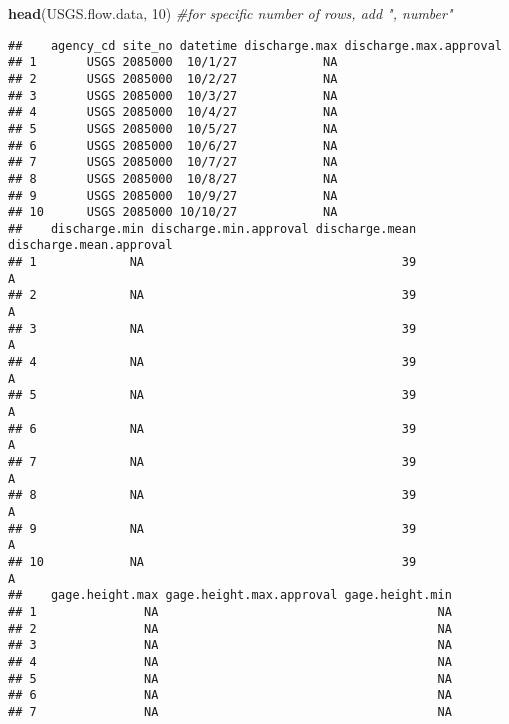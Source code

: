 \documentclass[]{article}
\newenvironment{Shaded}{\begin{snugshade}}{\end{snugshade}}
\newcommand{\CommentTok}[1]{\textcolor[rgb]{0.56,0.35,0.01}{\textit{#1}}}
\newcommand{\DecValTok}[1]{\textcolor[rgb]{0.00,0.00,0.81}{#1}}
\newcommand{\KeywordTok}[1]{\textcolor[rgb]{0.13,0.29,0.53}{\textbf{#1}}}
\newcommand{\NormalTok}[1]{#1}
\begin{document}
\begin{Shaded}
\begin{Highlighting}[]
\KeywordTok{head}\NormalTok{(USGS.flow.data, }\DecValTok{10}\NormalTok{) }\CommentTok{#for specific number of rows, add ", number"}
\end{Highlighting}
\end{Shaded}

\begin{verbatim}
##    agency_cd site_no datetime discharge.max discharge.max.approval
## 1       USGS 2085000  10/1/27            NA                       
## 2       USGS 2085000  10/2/27            NA                       
## 3       USGS 2085000  10/3/27            NA                       
## 4       USGS 2085000  10/4/27            NA                       
## 5       USGS 2085000  10/5/27            NA                       
## 6       USGS 2085000  10/6/27            NA                       
## 7       USGS 2085000  10/7/27            NA                       
## 8       USGS 2085000  10/8/27            NA                       
## 9       USGS 2085000  10/9/27            NA                       
## 10      USGS 2085000 10/10/27            NA                       
##    discharge.min discharge.min.approval discharge.mean discharge.mean.approval
## 1             NA                                    39                       A
## 2             NA                                    39                       A
## 3             NA                                    39                       A
## 4             NA                                    39                       A
## 5             NA                                    39                       A
## 6             NA                                    39                       A
## 7             NA                                    39                       A
## 8             NA                                    39                       A
## 9             NA                                    39                       A
## 10            NA                                    39                       A
##    gage.height.max gage.height.max.approval gage.height.min
## 1               NA                                       NA
## 2               NA                                       NA
## 3               NA                                       NA
## 4               NA                                       NA
## 5               NA                                       NA
## 6               NA                                       NA
## 7               NA                                       NA

\end{verbatim}
\end{document}
